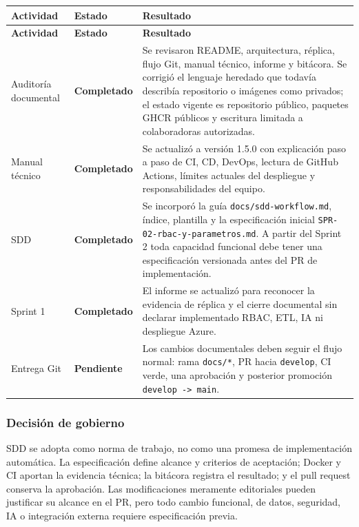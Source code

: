 \documentclass[11pt,letterpaper]{article}
\newcommand{\statusok}{\textcolor{deepgreen}{\textbf{Completado}}}
\newcommand{\statuspending}{\textcolor{warning}{\textbf{Pendiente}}}
\newcommand{\file}[1]{\texttt{#1}}
\begin{document}
\begin{longtable}{@{}p{}p{}p{}@{}}
  \toprule
  \textbf{Actividad} & \textbf{Estado} & \textbf{Resultado} \\
  \midrule
  \endfirsthead
  \toprule
  \textbf{Actividad} & \textbf{Estado} & \textbf{Resultado} \\
  \midrule
  \endhead
  Auditoría documental & \statusok & Se revisaron README, arquitectura, réplica, flujo Git, manual técnico, informe y bitácora. Se corrigió el lenguaje heredado que todavía describía repositorio o imágenes como privados; el estado vigente es repositorio público, paquetes GHCR públicos y escritura limitada a colaboradoras autorizadas. \\
  Manual técnico & \statusok & Se actualizó a versión 1.5.0 con explicación paso a paso de CI, CD, DevOps, lectura de GitHub Actions, límites actuales del despliegue y responsabilidades del equipo. \\
  SDD & \statusok & Se incorporó la guía \file{docs/sdd-workflow.md}, índice, plantilla y la especificación inicial \file{SPR-02-rbac-y-parametros.md}. A partir del Sprint 2 toda capacidad funcional debe tener una especificación versionada antes del PR de implementación. \\
  Sprint 1 & \statusok & El informe se actualizó para reconocer la evidencia de réplica y el cierre documental sin declarar implementado RBAC, ETL, IA ni despliegue Azure. \\
  Entrega Git & \statuspending & Los cambios documentales deben seguir el flujo normal: rama \file{docs/*}, PR hacia \file{develop}, CI verde, una aprobación y posterior promoción \file{develop -> main}. \\
  \bottomrule
\end{longtable}

\subsubsection{Decisión de gobierno}

SDD se adopta como norma de trabajo, no como una promesa de implementación automática. La especificación define alcance y criterios de aceptación; Docker y CI aportan la evidencia técnica; la bitácora registra el resultado; y el pull request conserva la aprobación. Las modificaciones meramente editoriales pueden justificar su alcance en el PR, pero todo cambio funcional, de datos, seguridad, IA o integración externa requiere especificación previa.
\end{document}
